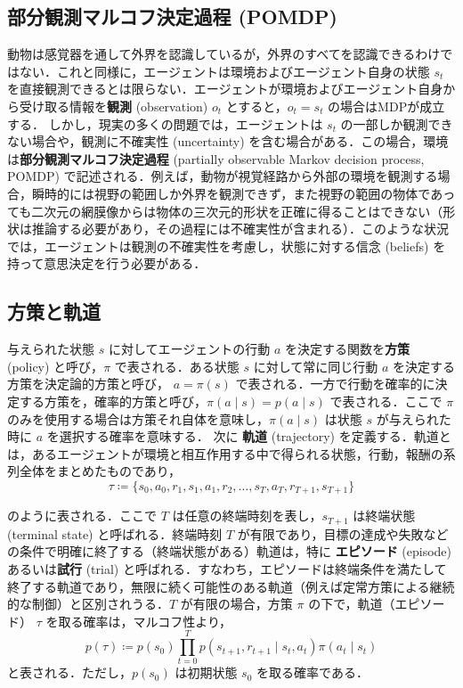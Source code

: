 \subsection{部分観測マルコフ決定過程 (POMDP)}
動物は感覚器を通して外界を認識しているが，外界のすべてを認識できるわけではない．これと同様に，エージェントは環境およびエージェント自身の状態 $s_t$ を直接観測できるとは限らない．エージェントが環境およびエージェント自身から受け取る情報を\textbf{観測} (observation) $o_t$ とすると，$o_t = s_t$ の場合はMDPが成立する．
しかし，現実の多くの問題では，エージェントは $s_t$ の一部しか観測できない場合や，観測に不確実性 (uncertainty) を含む場合がある．この場合，環境は\textbf{部分観測マルコフ決定過程} (partially observable Markov decision process, POMDP) で記述される．例えば，動物が視覚経路から外部の環境を観測する場合，瞬時的には視野の範囲しか外界を観測できず，また視野の範囲の物体であっても二次元の網膜像からは物体の三次元的形状を正確に得ることはできない（形状は推論する必要があり，その過程には不確実性が含まれる）．このような状況では，エージェントは観測の不確実性を考慮し，状態に対する信念 (beliefs) を持って意思決定を行う必要がある．
\subsection{方策と軌道}
与えられた状態 $s$ に対してエージェントの行動 $a$ を決定する関数を\textbf{方策} (policy) と呼び，$\pi$ で表される．ある状態 $s$ に対して常に同じ行動 $a$ を決定する方策を決定論的方策と呼び， $a=\pi(s)$ で表される．一方で行動を確率的に決定する方策を，確率的方策と呼び，$\pi(a \mid s) = p(a \mid s)$ で表される．ここで $\pi$ のみを使用する場合は方策それ自体を意味し，$\pi(a \mid s)$ は状態 $s$ が与えられた時に $a$ を選択する確率を意味する．
次に \textbf{軌道} (trajectory) を定義する．軌道とは，あるエージェントが環境と相互作用する中で得られる状態，行動，報酬の系列全体をまとめたものであり，
\begin{equation}
\tau \coloneqq  \{s_0, a_0, r_1, s_1, a_1, r_2, \ldots, s_T, a_T, r_{T+1}, s_{T+1}\}
\end{equation}
  
のように表される．ここで $T$ は任意の終端時刻を表し，$s_{T+1}$ は終端状態 (terminal state) と呼ばれる．終端時刻 $T$ が有限であり，目標の達成や失敗などの条件で明確に終了する（終端状態がある）軌道は，特に \textbf{エピソード} (episode) あるいは\textbf{試行} (trial) と呼ばれる．すなわち，エピソードは終端条件を満たして終了する軌道であり，無限に続く可能性のある軌道（例えば定常方策による継続的な制御）と区別されうる．$T$ が有限の場合，方策 $\pi$ の下で，軌道（エピソード） $\tau$ を取る確率は，マルコフ性より，
\begin{equation}
p(\tau) \coloneqq  p(s_0) \prod_{t=0}^T p(s_{t+1}, r_{t+1}\mid s_t, a_t) \pi(a_t \mid s_t)
\end{equation}
と表される．ただし，$p(s_0)$ は初期状態 $s_0$ を取る確率である．
